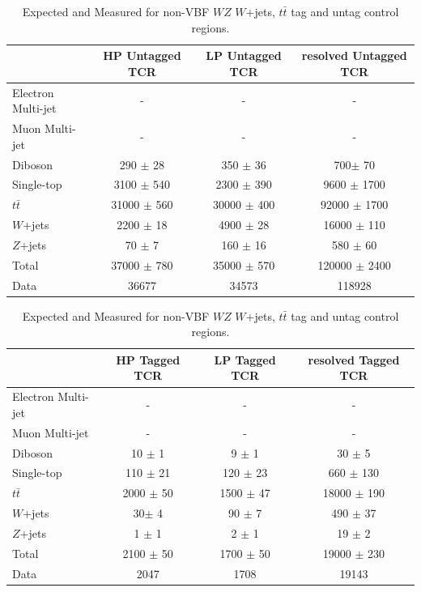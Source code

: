 \begin{table}
\begin{tabular}{|l|c|c|c|}
\hline
	  &	 HP Untagged TCR &	 LP Untagged TCR &	resolved Untagged TCR \\\hline 
	Electron Multi-jet &	- &	- &	- \\\hline 
	Muon Multi-jet &	- &	- &	- \\\hline 
	Diboson &	290 $\pm$ 28 &	350 $\pm$ 36 &	700$\pm$ 70 \\\hline 
	Single-top &	3100 $\pm$ 540 &	2300 $\pm$ 390 &	9600 $\pm$ 1700\\\hline 
	$t\bar{t}$ &	31000 $\pm$ 560 &	30000 $\pm$ 400 &	92000 $\pm$ 1700 \\\hline 
	$W$+jets &	2200 $\pm$ 18 &	4900 $\pm$ 28 &	16000 $\pm$ 110 \\\hline 
	$Z$+jets &	70 $\pm$ 7 &	160 $\pm$ 16 &	580 $\pm$ 60 \\\hline 
	Total &	37000 $\pm$ 780&	35000 $\pm$ 570&	120000 $\pm$ 2400 \\\hline 
	Data &	36677 &	34573 &	118928 \\\hline 
\end{tabular}

\begin{tabular}{|l|c|c|c|}
\hline
	  &	 HP Tagged TCR &	 LP Tagged TCR &	resolved Tagged TCR \\\hline 
	Electron Multi-jet &	- &	- &	- \\\hline 
	Muon Multi-jet &	- &	- &	- \\\hline 
	Diboson &	10 $\pm$ 1 &	9 $\pm$ 1 &	30 $\pm$ 5\\\hline 
	Single-top &	110 $\pm$ 21 &	120 $\pm$ 23 &	660 $\pm$ 130 \\\hline 
	$t\bar{t}$ &	2000 $\pm$ 50 &	1500 $\pm$ 47 &	18000 $\pm$ 190 \\\hline 
	$W$+jets &	30$\pm$ 4 &	90 $\pm$ 7 &	490 $\pm$ 37 \\\hline 
	$Z$+jets &	1 $\pm$ 1 &	2 $\pm$ 1 &	19 $\pm$ 2 \\\hline 
	Total &	2100 $\pm$ 50 &	1700 $\pm$ 50 &	19000 $\pm$ 230 \\\hline 
	Data &	2047 &	1708 &	19143 \\\hline 
\end{tabular}


\caption{Expected and Measured for non-VBF $WZ$ $W$+jets, $t\bar{t}$ tag and untag control regions.}
\label{tbl:hvtwz_yields_cr}
\end{table}

